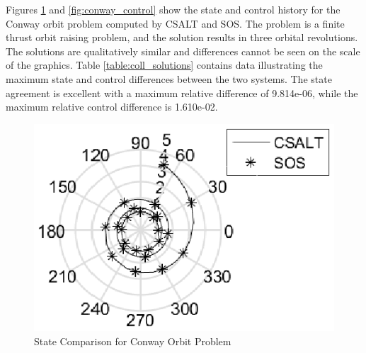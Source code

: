 \documentclass[ISTS  ]{tjsass} %
\begin{document}
Figures \ref{fig:conway_state} and \ref{fig:conway_control} show the state and control history for the Conway orbit problem computed by CSALT and SOS.  The problem is a finite thrust orbit raising problem, and the solution results in three orbital revolutions.  The solutions are qualitatively similar and differences cannot be seen on the scale of the graphics. Table \ref{table:coll_solutions} contains data illustrating the maximum state and control differences between the two systems. The state agreement is excellent with a maximum relative difference of 9.814e-06, while the maximum relative control difference is 1.610e-02.
%
\begin{figure}[h]
    \centering
    \includegraphics[width=\columnwidth]{../Figures/ConwayOrbit_StateCompare.eps}
    \caption{State Comparison for Conway Orbit Problem}
    \label{fig:conway_state}
\end{figure}
%
\end{document}
